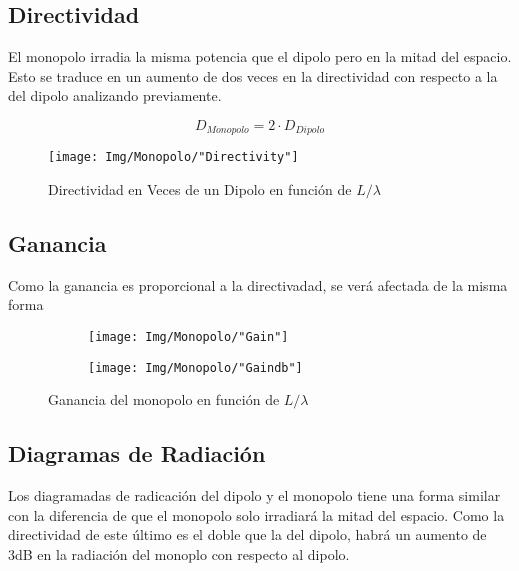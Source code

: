 \documentclass{article}
\begin{document}
\subsection{Directividad}

El monopolo irradia la misma potencia que el dipolo pero en la mitad del espacio. Esto se traduce en un aumento de dos veces en la directividad con respecto a la del dipolo analizando previamente.

\begin{equation}
    D_{Monopolo} = 2\cdot D_{Dipolo}
\end{equation}

\begin{figure}[H]
        \centering
        \texttt{[image: Img/Monopolo/"Directivity"]}
        \caption{Directividad en Veces de un Dipolo en función de $L/\lambda$}
\end{figure}

\subsection{Ganancia}

Como la ganancia es proporcional a la directivadad, se verá afectada de la misma forma

\begin{figure}[H]

   \begin{subfigure}[h]{0.5\textwidth}
        \centering
        \texttt{[image: Img/Monopolo/"Gain"]}
    \end{subfigure}
    \begin{subfigure}[h]{0.5\textwidth}
        \centering
        \texttt{[image: Img/Monopolo/"Gaindb"]}
    \end{subfigure}
    \caption{Ganancia del monopolo en función de $L/\lambda$}
\end{figure}


\subsection{Diagramas de Radiación}

Los diagramadas de radicación del dipolo y el monopolo tiene una forma similar con la diferencia de que el monopolo solo irradiará la mitad del espacio. Como la directividad de este último es el doble que la del dipolo, habrá un aumento de 3dB en la radiación del monoplo con respecto al dipolo.
\end{document}
